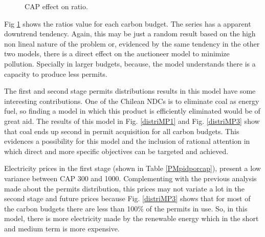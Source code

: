 \documentclass[a4paper,fleqn]{cas-dc}
\begin{document}
\begin{figure}[h]
\centering
{}
\caption{{\footnotesize CAP effect on ratio.}}
\label{rendcapMP2}
\end{figure}

Fig \ref{rendcapMP2} shows the ratios value for each carbon budget. The series has a apparent downtrend tendency. Again, this may be just a random result based on the high non lineal nature of the problem or, evidenced by the same tendency in the other two models, there is a direct effect on the auctioneer model to minimize pollution. Specially in larger budgets, because, the model understands there is a capacity to produce less permits.

The first and second stage permits distributions results in this model have some interesting contributions. One of the Chilean NDCs is to eliminate coal as energy fuel, so finding a model in which this product is efficiently eliminated would be of great aid. The results of this model in Fig. \ref{distriMP1} and Fig. \ref{distriMP3} show that coal ends up second in permit acquisition for all carbon budgets. This evidences a possibility for this model and the inclusion of rational attention in which direct and more specific objectives can be targeted and achieved.

Electricity prices in the first stage (shown in Table \ref{PMpidporcap}), present a low variance between CAP 300 and 1000. Complementing with the previous analysis made about the permits distribution, this prices may not variate a lot in the second stage and future prices because Fig. \ref{distriMP3} shows that for most of the carbon budgets there are less than 100\% of the permits in use. So, in this model, there is more electricity made by the renewable energy which in the short and medium term is more expensive.
\end{document}
